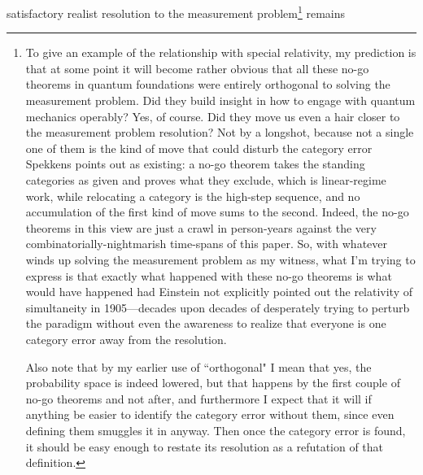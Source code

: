 \documentclass{article}
\begin{document}
satisfactory realist resolution to the measurement problem\footnote{To give an example of the relationship with special relativity, my prediction is that at some point it will become rather obvious that all these no-go theorems in quantum foundations were entirely orthogonal to solving the measurement problem. Did they build insight in how to engage with quantum mechanics operably? Yes, of course. Did they move us even a hair closer to the measurement problem resolution? Not by a longshot, because not a single one of them is the kind of move that could disturb the category error Spekkens \cite{spekkens2010einstein} points out as existing: a no-go theorem takes the standing categories as given and proves what they exclude, which is linear-regime work, while relocating a category is the high-step sequence, and no accumulation of the first kind of move sums to the second. Indeed, the no-go theorems in this view are just a crawl in person-years against the very combinatorially-nightmarish time-spans of this paper. So, with whatever winds up solving the measurement problem as my witness, what I'm trying to express is that exactly what happened with these no-go theorems is what would have happened had Einstein not explicitly pointed out the relativity of simultaneity in 1905---decades upon decades of desperately trying to perturb the paradigm without even the awareness to realize that everyone is one category error away from the resolution.\par
Also note that by my earlier use of ``orthogonal" I mean that yes, the probability space is indeed lowered, but that happens by the first couple of no-go theorems and not after, and furthermore I expect that it will if anything be easier to identify the category error without them, since even defining them smuggles it in anyway. Then once the category error is found, it should be easy enough to restate its resolution as a refutation of that definition.} remains
\end{document}
